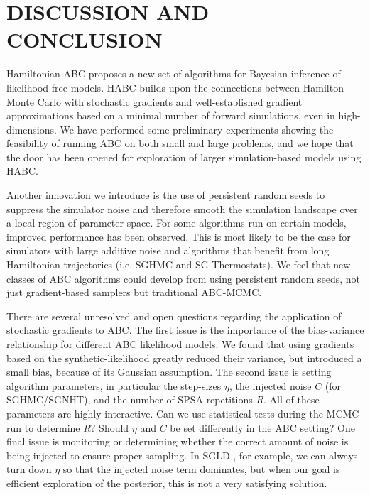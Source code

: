 \documentclass[]{article}
\begin{document}


\section{DISCUSSION AND CONCLUSION} \label{sec:conclusion}
Hamiltonian ABC proposes a new set of algorithms for Bayesian inference of likelihood-free models.  HABC builds  upon the connections between Hamilton Monte Carlo with stochastic gradients and well-established gradient approximations based on a minimal number of forward simulations, even in high-dimensions.  We have performed some preliminary experiments showing the feasibility of running ABC on both small and large problems, and we hope that the door has been opened for exploration of larger simulation-based models using HABC. 

Another innovation we introduce is the use of persistent random seeds to suppress the simulator noise and therefore smooth the simulation landscape over a local region of parameter space. For some algorithms run on certain models, improved performance has been observed.  This is most likely to be the case for simulators with large additive noise and algorithms that benefit from long Hamiltonian trajectories (i.e. SGHMC and SG-Thermostats).  We feel that new classes of ABC algorithms could develop from using persistent random seeds, not just gradient-based samplers but traditional ABC-MCMC.
 
There are several unresolved and open questions regarding the application of stochastic gradients to ABC.  The first issue is the importance of the bias-variance relationship for different ABC likelihood models.    We found that using gradients based on the synthetic-likelihood greatly reduced their variance, but introduced a small bias, because of its Gaussian assumption.  The second issue is setting algorithm parameters, in particular the step-sizes $\eta$, the injected noise $C$ (for SGHMC/SGNHT), and the number of SPSA repetitions $R$.  All of these parameters are highly interactive.  Can we use statistical tests during the MCMC run to determine $R$?  Should $\eta$ and $C$ be set differently in the ABC setting?  One final issue is monitoring or determining whether the correct amount of noise is being injected to ensure proper sampling.  In SGLD \cite{welling2011bayesian}, for example, we can always turn down $\eta$ so that the injected noise term dominates, but when our goal is efficient exploration of the posterior, this is  not a very satisfying solution.
\end{document}
